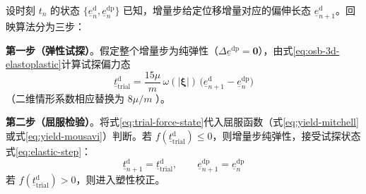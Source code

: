 设时刻 $t_{n}$ 的状态 $\{\underline{e}^{\mathrm{d}}_{n},\underline{e}^{\mathrm{dp}}_{n}\}$ 已知，增量步给定位移增量对应的偏伸长态 $\underline{e}^{\mathrm{d}}_{n+1}$。回映算法分为三步：

\textbf{第一步（弹性试探）}。假定整个增量步为纯弹性（$\Delta\underline{e}^{\mathrm{dp}}=\mathbf{0}$），由式\eqref{eq:osb-3d-elastoplastic}计算试探偏力态
\begin{equation}
  \underline{t}^{\mathrm{d}}_{\mathrm{trial}}=
  \frac{15\mu}{m}\,\omega(|\boldsymbol{\xi}|)\,
  \bigl(\underline{e}^{\mathrm{d}}_{n+1}-\underline{e}^{\mathrm{dp}}_{n}\bigr)
  \label{eq:trial-force-state}
\end{equation}
（二维情形系数相应替换为 $8\mu/m$ \cite{Mousavi2021}）。

\textbf{第二步（屈服检验）}。将式\eqref{eq:trial-force-state}代入屈服函数（式\eqref{eq:yield-mitchell}或式\eqref{eq:yield-mousavi}）判断。若 $f(\underline{t}^{\mathrm{d}}_{\mathrm{trial}})\le 0$，则增量步纯弹性，接受试探状态式\eqref{eq:elastic-step}：
\begin{equation}
  \underline{t}^{\mathrm{d}}_{n+1}=\underline{t}^{\mathrm{d}}_{\mathrm{trial}},\qquad
  \underline{e}^{\mathrm{dp}}_{n+1}=\underline{e}^{\mathrm{dp}}_{n}
  \label{eq:elastic-step}
\end{equation}
若 $f(\underline{t}^{\mathrm{d}}_{\mathrm{trial}})>0$，则进入塑性校正。

